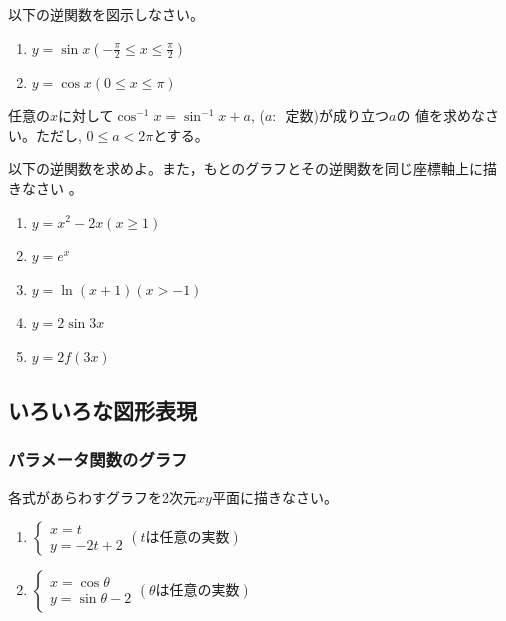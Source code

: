 \documentclass[twocolumn,11pt]{jarticle}
\begin{document}
\nquestion
以下の逆関数を図示しなさい。
\begin{enumerate}
\item $y=\sin x$\quad $\displaystyle(-\frac{\pi}{2}\le x \le\frac{\pi}{2})$
\item $y=\cos x$\quad $\displaystyle(0\le x \le \pi)$
\end{enumerate}

\nquestion
任意の$x$に対して$\cos^{-1}x=\sin^{-1}x+a$, ($a:$~定数)が成り立つ$a$の
値を求めなさい。ただし, $0\le a<2\pi$とする。

\nquestion
以下の逆関数を求めよ。また，もとのグラフとその逆関数を同じ座標軸上に描
きなさい
。
\begin{enumerate}
\item\label{item:inv(xx-2x)} $y=x^2-2x$\quad $(x \geq 1)$
\item\label{item:inv(expx)} $y=e^x$
\item\label{item:inv(ln(x+1))} $y=\ln (x+1)$\quad$(x>-1)$
\item\label{item:inv(2sin3x)} $y=2\sin 3x$
\item\label{item:inv(2f(3x))} $y=2f(3x)$
\end{enumerate}

\subsection{いろいろな図形表現}
\subsubsection{パラメータ関数のグラフ}

\question
各式があらわすグラフを2次元$xy$平面に描きなさい。
\begin{enumerate}
\item 
$    \begin{cases}
      x=t\\
      y=-2t+2
    \end{cases}(t\mbox{は任意の実数})$
\item 
$    \begin{cases}
      x=\cos\theta\\
      y=\sin\theta -2
    \end{cases}(\theta\mbox{は任意の実数})$
\end{enumerate}
\end{document}
